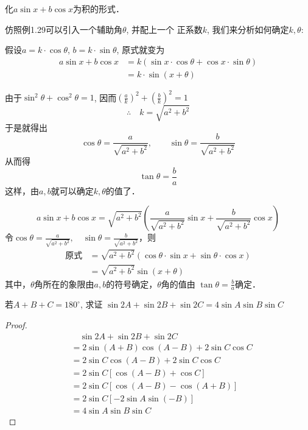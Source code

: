 \begin{example}
    化$a\sin x+b\cos x$为积的形式．
\end{example}

\begin{analyze}
仿照例1.29可以引入一个辅助角$\theta$, 并配上一个
正系数$k$, 我们来分析如何确定$k,\theta$:

假设$a=k\cdot \cos\theta$, $b=k\cdot\sin\theta$, 原式就变为
\[\begin{split}
    a\sin x+b\cos x&=k(\sin x\cdot \cos\theta+ \cos x\cdot \sin\theta)\\
    &=k\cdot \sin (x+\theta) 
\end{split}\]

由于$\sin^2\theta+\cos^2\theta=1$, 因而$\left(\frac{a}{k}\right)^2+\left(\frac{b}{k}\right)^2=1$
\[\therefore\quad k=\sqrt{a^2+b^2}\]
于是就得出
\[\cos\theta=\frac{a}{\sqrt{a^2+b^2}},\qquad  \sin\theta=\frac{b}{\sqrt{a^2+b^2}} \]
从而得
\[\tan\theta =\frac{b}{a}\]
这样，由$a,b$就可以确定$k,\theta$的值了．
\end{analyze}

\begin{solution}
\[a\sin x+b\cos x=\sqrt{a^2+b^2}\left(\frac{a}{\sqrt{a^2+b^2}}\sin x+\frac{b}{\sqrt{a^2+b^2}}\cos x\right)\]
令$\cos\theta=\frac{a}{\sqrt{a^2+b^2}},\quad  \sin\theta=\frac{b}{\sqrt{a^2+b^2}}$，则
\[\begin{split}
    \text{原式}&=\sqrt{a^2+b^2}(\cos\theta\cdot \sin x+\sin\theta \cdot \cos x)\\
&=\sqrt{a^2+b^2}\sin (x+\theta)
\end{split}\]
其中，$\theta$角所在的象限由$a,b$的符号确定，$\theta$角的值由
$\tan\theta=\frac{b}{a}$确定．
\end{solution}


\begin{example}
    若$A+B+C=180^{\circ}$, 求证
$\sin2A+\sin2B+\sin2C=4\sin A\sin B\sin C$
\end{example}

\begin{proof}
\begin{align*}
  &\quad   \sin2A+\sin2B+\sin2C\\
    &=2\sin (A+B) \cos(A-B) +2\sin C\cos C\\
    &=2\sin C\cos (A-B) +2\sin C\cos C \tag{$\sin (A+B)=\sin C$}\\
    &=2\sin C [\cos(A-B)+\cos C]\\
    &=2\sin C [\cos(A-B)-\cos(A+B)]
    \tag{$\cos C=-\cos (A+B)$}\\
    &=2\sin C [-2\sin A\sin (-B)]\\
    &=4\sin A\sin B\sin C  
\end{align*}
\end{proof}

